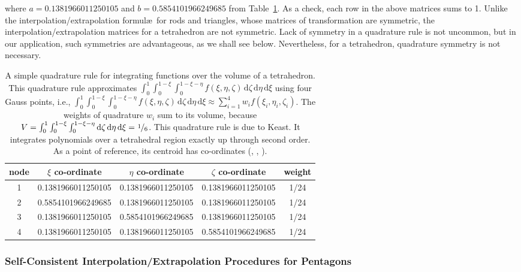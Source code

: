 where $a = 0.1381966011250105$ and $b = 0.5854101966249685$ from Table~\ref{tab:4nodedTet}.  As a check, each row in the above matrices sums to 1.  Unlike the interpolation\slash extrapolation formul\ae\ for rods and triangles, whose matrices of transformation are symmetric, the interpolation\slash extrapolation matrices for a tetrahedron are not symmetric.  Lack of symmetry in a quadrature rule is not uncommon, but in our application, such symmetries are advantageous, as we shall see below.  Nevertheless, for a tetrahedron, quadrature symmetry is not necessary.
    
\begin{table}
    \small
    \begin{tabular}{|c|cccc|}
        \hline
        node & $\xi$ co-ordinate & $\eta$ co-ordinate & 
        $\zeta$ co-ordinate & weight \\ \hline        
        1 & 0.1381966011250105 & 0.1381966011250105 & 0.1381966011250105 & 1/24 \\
        2 & 0.5854101966249685 & 0.1381966011250105 & 0.1381966011250105 & 1/24 \\
        3 & 0.1381966011250105 & 0.5854101966249685 & 0.1381966011250105 & 1/24 \\
        4 & 0.1381966011250105 & 0.1381966011250105 & 0.5854101966249685 & 1/24 \\
        \hline
    \end{tabular}
    \normalsize
    \caption{A simple quadrature rule for integrating functions over the volume of a tetrahedron.  This quadrature rule approximates $\int_0^1 \int_0^{1-\xi} \int_0^{1-\xi-\eta} f(\xi, \eta, \zeta) \, \mathrm{d}\zeta \, \mathrm{d}\eta \, \mathrm{d}\xi$ using four Gauss points, i.e., $\int_0^1 \int_0^{1-\xi} \int_0^{1-\xi-\eta} f(\xi, \eta, \zeta) \, \mathrm{d}\zeta \, \mathrm{d}\eta \, \mathrm{d}\xi \approx \sum_{i=1}^4 w_i f( \xi_i , \eta_i , \zeta_i )$.  The weights of quadrature $w_i$ sum to its volume, because $V = \int_0^1 \int_0^{1-\xi} \int_0^{1-\xi-\eta} \mathrm{d}\zeta \, \mathrm{d}\eta \, \mathrm{d}\xi = \textfrac{1}{6}$.  This quadrature rule is due to Keast.  It integrates polynomials over a tetrahedral region exactly up through second order.  As a point of reference, its centroid has co-ordinates (, , ).}
    \label{tab:4nodedTet}
\end{table}

\subsubsection{Self-Consistent Interpolation\slash Extrapolation Procedures for Pentagons}

